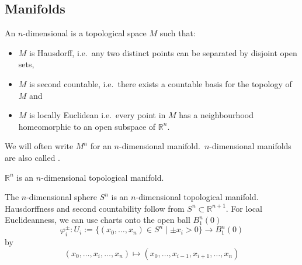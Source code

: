 \documentclass[a4paper,11pt]{article}
\begin{document}
\subsection{Manifolds}

\begin{definition}
    An \(n\)-dimensional  is a topological space \(M\) such that:
    \begin{itemize}
        \item \(M\) is Hausdorff, i.e.\ any two distinct points can be separated by disjoint open sets,
        \item \(M\) is second countable, i.e.\ there exists a countable basis for the topology of \(M\) and
        \item \(M\) is locally Euclidean i.e.\ every point in \(M\) has a neighbourhood homeomorphic to an open subspace of \(\mathbb{R}^n\).
    \end{itemize}
    We will often write \(M^n\) for an \(n\)-dimensional manifold.\ \(n\)-dimensional manifolds are also called .
\end{definition}


\begin{example}
    \(\mathbb{R}^n\) is an \(n\)-dimensional topological manifold.
\end{example}

\begin{example}\label{sphere chart}
    The \(n\)-dimensional sphere \(S^n\) is an \(n\)-dimensional topological manifold. Hausdorffness and second countability follow from \(S^n\subset \mathbb{R}^{n+1}\). For local Euclideanness, we can use charts onto the open ball \(B_1^n(0)\)
     \[\varphi_i^\pm:U_i:=\{(x_0,\dots,x_n)\in S^n\mid \pm x_i>0\}\to B_1^n(0)\] by \[(x_0,\dots,x_i,\dots,x_n)\mapsto(x_0,\dots,x_{i-1},x_{i+1},\dots,x_n)\]
\end{example}
\end{document}
